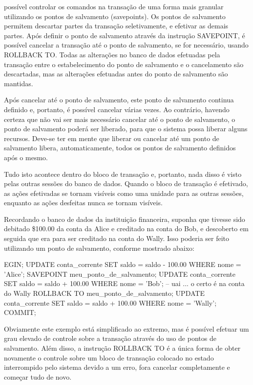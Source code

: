  possível controlar os comandos na transação de uma forma mais granular utilizando os pontos de salvamento (savepoints). Os pontos de salvamento permitem descartar partes da transação seletivamente, e efetivar as demais partes. Após definir o ponto de salvamento através da instrução SAVEPOINT, é possível cancelar a transação até o ponto de salvamento, se for necessário, usando ROLLBACK TO. Todas as alterações no banco de dados efetuadas pela transação entre o estabelecimento do ponto de salvamento e o cancelamento são descartadas, mas as alterações efetuadas antes do ponto de salvamento são mantidas.

 Após cancelar até o ponto de salvamento, este ponto de salvamento continua definido e, portanto, é possível cancelar várias vezes. Ao contrário, havendo certeza que não vai ser mais necessário cancelar até o ponto de salvamento, o ponto de salvamento poderá ser liberado, para que o sistema possa liberar alguns recursos. Deve-se ter em mente que liberar ou cancelar até um ponto de salvamento libera, automaticamente, todos os pontos de salvamento definidos após o mesmo.

 Tudo isto acontece dentro do bloco de transação e, portanto, nada disso é visto pelas outras sessões do banco de dados. Quando o bloco de transação é efetivado, as ações efetivadas se tornam visíveis como uma unidade para as outras sessões, enquanto as ações desfeitas nunca se tornam visíveis.

 Recordando o banco de dados da instituição financeira, suponha que tivesse sido debitado \$100.00 da conta da Alice e creditado na conta do Bob, e descoberto em seguida que era para ser creditado na conta do Wally. Isso poderia ser feito utilizando um ponto de salvamento, conforme mostrado abaixo:

\begin{BoxVerbatim}
EGIN;
UPDATE conta_corrente SET saldo = saldo - 100.00
    WHERE nome = 'Alice';
SAVEPOINT meu_ponto_de_salvamento;
UPDATE conta_corrente SET saldo = saldo + 100.00
    WHERE nome = 'Bob';
-- uai ... o certo é na conta do Wally
ROLLBACK TO meu_ponto_de_salvamento;
UPDATE conta_corrente SET saldo = saldo + 100.00
    WHERE nome = 'Wally';
COMMIT;
\end{BoxVerbatim}

Obviamente este exemplo está simplificado ao extremo, mas é possível efetuar um grau elevado de controle sobre a transação através do uso de pontos de salvamento. Além disso, a instrução ROLLBACK TO é a única forma de obter novamente o controle sobre um bloco de transação colocado no estado interrompido pelo sistema devido a um erro, fora cancelar completamente e começar tudo de novo.


